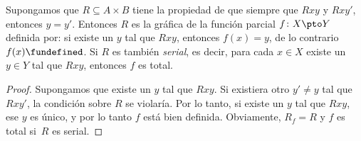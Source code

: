 \documentclass[../../../include/open-logic-section]{subfiles}
\begin{document}
\begin{prop}
Supongamos que $R \subseteq A \times B$ tiene la propiedad de que siempre que $Rxy$ y $Rxy'$, entonces $y = y'$. Entonces $R$ es la gráfica de la función parcial $f\colon X \pto Y$ definida por: si existe un $y$ tal que $Rxy$, entonces $f(x) = y$, de lo contrario $f(x) \fundefined$. Si $R$ es también \emph{serial}, es decir, para cada $x \in X$ existe un $y \in Y$ tal que $Rxy$, entonces $f$ es total.
\end{prop}

\begin{proof}
Supongamos que existe un $y$ tal que $Rxy$. Si existiera otro $y' \neq y$ tal que $Rxy'$, la condición sobre $R$ se violaría. Por lo tanto, si existe un $y$ tal que $Rxy$, ese $y$ es único, y por lo tanto $f$ está bien definida. Obviamente, $R_f = R$ y $f$ es total si~$R$ es serial.
\end{proof}
\end{document}
